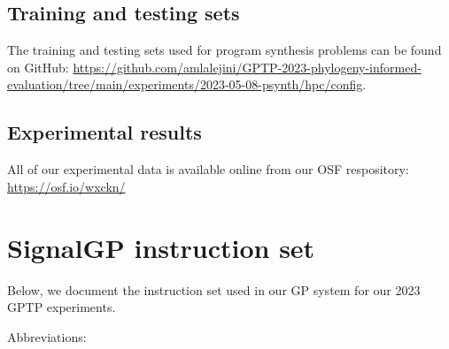 \documentclass[
]{book}
\begin{document}
\hypertarget{training-and-testing-sets}{%
\section{Training and testing sets}\label{training-and-testing-sets}}

The training and testing sets used for program synthesis problems can be found on GitHub: \url{https://github.com/amlalejini/GPTP-2023-phylogeny-informed-evaluation/tree/main/experiments/2023-05-08-psynth/hpc/config}.

\hypertarget{experimental-results}{%
\section{Experimental results}\label{experimental-results}}

All of our experimental data is available online from our OSF respository: \url{https://osf.io/wxckn/}

\hypertarget{signalgp-instruction-set}{%
\chapter{SignalGP instruction set}\label{signalgp-instruction-set}}

Below, we document the instruction set used in our GP system for our 2023 GPTP experiments.

Abbreviations:
\end{document}
